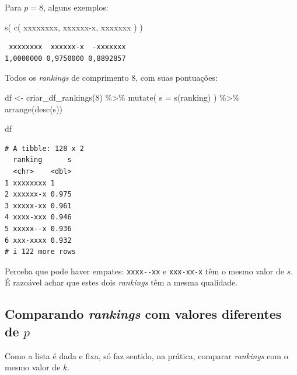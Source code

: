 \documentclass[
  letterpaper,
  DIV=11,
  numbers=noendperiod]{scrreprt}
\newenvironment{Shaded}{\begin{snugshade}}{\end{snugshade}}
\newcommand{\AttributeTok}[1]{\textcolor[rgb]{0.40,0.45,0.13}{#1}}
\newcommand{\DecValTok}[1]{\textcolor[rgb]{0.68,0.00,0.00}{#1}}
\newcommand{\FunctionTok}[1]{\textcolor[rgb]{0.28,0.35,0.67}{#1}}
\newcommand{\NormalTok}[1]{\textcolor[rgb]{0.00,0.23,0.31}{#1}}
\newcommand{\OtherTok}[1]{\textcolor[rgb]{0.00,0.23,0.31}{#1}}
\newcommand{\SpecialCharTok}[1]{\textcolor[rgb]{0.37,0.37,0.37}{#1}}
\newcommand{\StringTok}[1]{\textcolor[rgb]{0.13,0.47,0.30}{#1}}
\begin{document}
Para $p = 8$, alguns exemplos:

\begin{Shaded}
\begin{Highlighting}[]
\FunctionTok{s}\NormalTok{(}
  \FunctionTok{c}\NormalTok{(}
    \StringTok{\textquotesingle{}xxxxxxxx\textquotesingle{}}\NormalTok{,}
    \StringTok{\textquotesingle{}xxxxxx{-}x\textquotesingle{}}\NormalTok{,}
    \StringTok{\textquotesingle{}{-}xxxxxxx\textquotesingle{}}
\NormalTok{  )}
\NormalTok{)}
\end{Highlighting}
\end{Shaded}

\begin{verbatim}
 xxxxxxxx  xxxxxx-x  -xxxxxxx 
1,0000000 0,9750000 0,8892857 
\end{verbatim}

Todos os \emph{rankings} de comprimento $8$, com suas pontuações:

\begin{Shaded}
\begin{Highlighting}[]
\NormalTok{df }\OtherTok{\textless{}{-}} \FunctionTok{criar\_df\_rankings}\NormalTok{(}\DecValTok{8}\NormalTok{) }\SpecialCharTok{\%\textgreater{}\%} 
  \FunctionTok{mutate}\NormalTok{(}
    \AttributeTok{s =} \FunctionTok{s}\NormalTok{(ranking)}
\NormalTok{  ) }\SpecialCharTok{\%\textgreater{}\%} 
  \FunctionTok{arrange}\NormalTok{(}\FunctionTok{desc}\NormalTok{(s))}

\NormalTok{df}
\end{Highlighting}
\end{Shaded}

\begin{verbatim}
# A tibble: 128 x 2
  ranking      s
  <chr>    <dbl>
1 xxxxxxxx 1    
2 xxxxxx-x 0.975
3 xxxxx-xx 0.961
4 xxxx-xxx 0.946
5 xxxxx--x 0.936
6 xxx-xxxx 0.932
# i 122 more rows
\end{verbatim}

Perceba que pode haver empates: \texttt{xxxx-\/-xx} e \texttt{xxx-xx-x}
têm o mesmo valor de $s$. É razoável achar que estes dois
\emph{rankings} têm a mesma qualidade.

\subsection{\texorpdfstring{Comparando \emph{rankings} com valores
diferentes de
$p$}{Comparando rankings com valores diferentes de }}\label{comparando-rankings-com-valores-diferentes-de-p}

Como a lista é dada e fixa, só faz sentido, na prática, comparar
\emph{rankings} com o mesmo valor de $k$.
\end{document}
